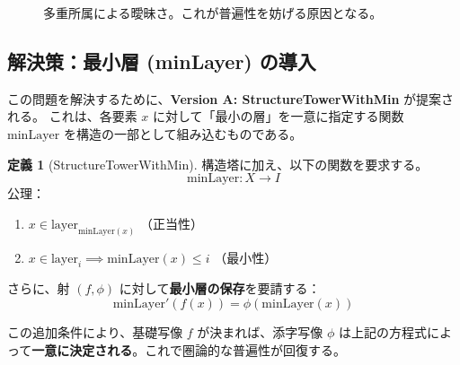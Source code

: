 \documentclass[a4paper,11pt]{ltjsarticle}
\theoremstyle{definition}
\newtheorem{definition}{定義}[section]
\newcommand{\Tower}{\mathcal{T}}
\newcommand{\Layer}[1]{\mathrm{layer}_{#1}}
\newcommand{\MinLayer}{\mathrm{minLayer}}
\begin{document}
\begin{figure}[h]
\centering
{}
\caption{多重所属による曖昧さ。これが普遍性を妨げる原因となる。}
\end{figure}

\subsection{解決策：最小層 (minLayer) の導入}
この問題を解決するために、\textbf{Version A: StructureTowerWithMin} が提案される。
これは、各要素 $x$ に対して「最小の層」を一意に指定する関数 $\MinLayer$ を構造の一部として組み込むものである。

\begin{definition}[StructureTowerWithMin]
構造塔に加え、以下の関数を要求する。
\[ \MinLayer: X \to I \]
公理：
\begin{enumerate}
    \item $x \in \Layer{\MinLayer(x)}$ （正当性）
    \item $x \in \Layer{i} \implies \MinLayer(x) \le i$ （最小性）
\end{enumerate}
さらに、射 $(f, \phi)$ に対して\textbf{最小層の保存}を要請する：
\[ \MinLayer'(f(x)) = \phi(\MinLayer(x)) \]
\end{definition}

この追加条件により、基礎写像 $f$ が決まれば、添字写像 $\phi$ は上記の方程式によって\textbf{一意に決定される}。これで圏論的な普遍性が回復する。

\end{document}

